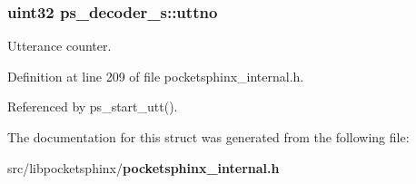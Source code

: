 \subsubsection[{uttno}]{\setlength{\rightskip}{0pt plus 5cm}uint32 ps\+\_\+decoder\+\_\+s\+::uttno}\label{structps__decoder__s_a0f597370dd162c2799efe216c9b991fc}


Utterance counter. 



Definition at line 209 of file pocketsphinx\+\_\+internal.\+h.



Referenced by ps\+\_\+start\+\_\+utt().



The documentation for this struct was generated from the following file\+:\begin{DoxyCompactItemize}
\item 
src/libpocketsphinx/{\bf pocketsphinx\+\_\+internal.\+h}\end{DoxyCompactItemize}
